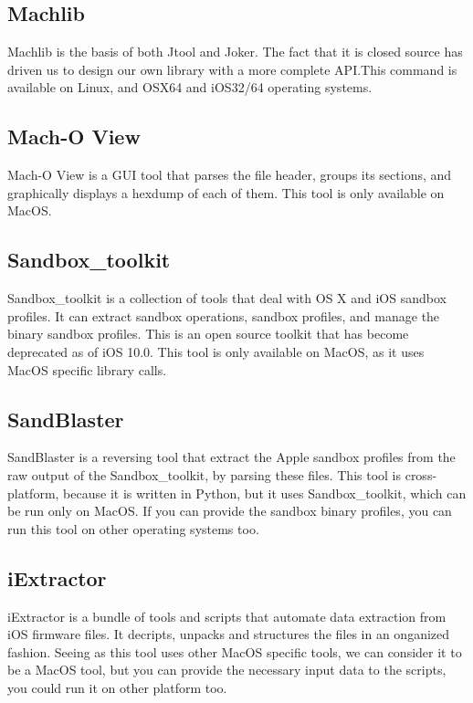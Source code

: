 \subsection{Machlib}

Machlib is the basis of both Jtool and Joker. The fact that it is closed
source has driven us to design our own library with a more complete API.This
command is available on Linux, and OSX64 and iOS32/64 operating systems.

\subsection{Mach-O View}

Mach-O View \cite{mach-o-view} is a GUI tool that parses the file header, groups its sections,
and graphically displays a hexdump of each of them. This tool is only
available on MacOS.

\subsection{Sandbox_toolkit}

Sandbox_toolkit \cite{sandbox-toolkit} is a collection of tools that deal with OS X and iOS sandbox
profiles. It can extract sandbox operations, sandbox profiles, and manage the
binary sandbox profiles. This is an open source toolkit that has become
deprecated as of iOS 10.0. This tool is only available on MacOS, as it uses
MacOS specific library calls.

\subsection{SandBlaster}

SandBlaster \cite{sandblaster} is a reversing tool that extract the Apple sandbox profiles from
the raw output of the Sandbox_toolkit, by parsing these files. This tool is
cross-platform, because it is written in Python, but it uses Sandbox_toolkit,
which can be run only on MacOS. If you can provide the sandbox binary
profiles, you can run this tool on other operating systems too.

\subsection{iExtractor}

iExtractor \cite{iextractor} is a bundle of tools and scripts that automate data extraction from
iOS firmware files. It decripts, unpacks and structures the files in an
onganized fashion. Seeing as this tool uses other MacOS specific tools, we
can consider it to be a MacOS tool, but you can provide the necessary input
data to the scripts, you could run it on other platform too.

